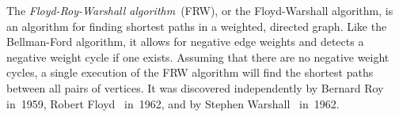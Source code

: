 The
\emph{Floyd-Roy-Warshall algorithm}~(FRW), or the
Floyd-Warshall algorithm, is an
algorithm for finding shortest paths in a
weighted, directed graph. Like the Bellman-Ford
algorithm, it allows for negative edge
weights and detects a negative weight
cycle if one exists. Assuming that there are no
negative weight cycles, a single execution of the FRW
algorithm will find the shortest paths between all pairs of
vertices. It was discovered independently by Bernard
Roy~\cite{Roy1959} in~1959, Robert
Floyd~\cite{Floyd1962} in~1962, and by Stephen
Warshall~\cite{Warshall1962} in~1962.

